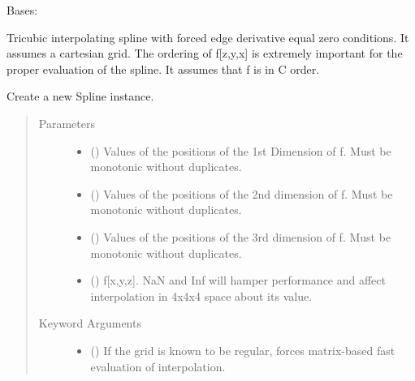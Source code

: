 \documentclass[letterpaper,10pt,english]{sphinxmanual}
\begin{document}
\begin{fulllineitems}
\label{\detokenize{eqtools:eqtools.trispline.Spline}}
Bases: 

Tricubic interpolating spline with forced edge derivative equal zero
conditions.  It assumes a cartesian grid.  The ordering of f{[}z,y,x{]} is
extremely important for the proper evaluation of the spline.  It assumes
that f is in C order.

Create a new Spline instance.
\begin{quote}\begin{description}
\item[{Parameters}] \leavevmode\begin{itemize}
\item {} 
 () \textendash{} Values of the positions of the 1st
Dimension of f. Must be monotonic without duplicates.

\item {} 
 () \textendash{} Values of the positions of the 2nd
dimension of f. Must be monotonic without duplicates.

\item {} 
 () \textendash{} Values of the positions of the 3rd
dimension of f. Must be monotonic without duplicates.

\item {} 
 () \textendash{} f{[}x,y,z{]}. NaN and Inf will hamper
performance and affect interpolation in 4x4x4 space about its value.

\end{itemize}

\item[{Keyword Arguments}] \leavevmode\begin{itemize}
\item {} 
 () \textendash{} If the grid is known to be regular, forces
matrix-based fast evaluation of interpolation.


\end{itemize}
\end{description}
\end{quote}
\end{fulllineitems}
\end{document}

